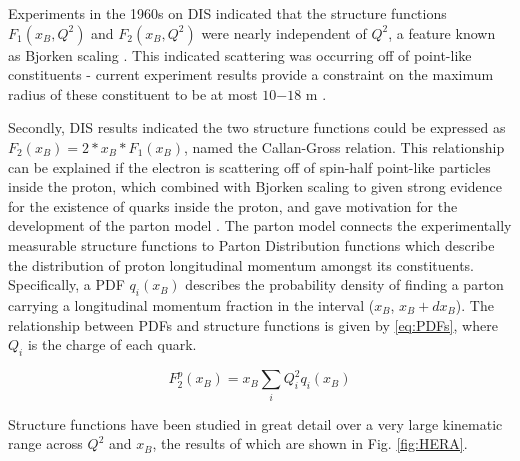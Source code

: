         Experiments in the 1960s on DIS indicated that the structure functions $F_1(x_B,Q^2)$ and $F_2(x_B,Q^2)$ were nearly independent of $Q^2$, a feature known as Bjorken scaling \parencite{Bjorken1969InelasticNucleon}. This indicated scattering was occurring off of point-like constituents - current experiment results provide a constraint on the maximum radius of these constituent to be at most $10{-18}$ m \parencite{Thomson2013ModernPhysics}. 


        Secondly, DIS results indicated the two structure functions could be expressed as $F_2(x_B) = 2*x_B*F_1(x_B)$, named the Callan-Gross relation. This relationship can be explained if the electron is scattering off of spin-half point-like particles inside the proton, which combined with Bjorken scaling to given strong evidence for the existence of quarks inside the proton, and gave motivation for the development of the parton model \parencite{Feynman1969VeryHadrons}.
        The parton model connects the experimentally measurable structure functions to Parton Distribution functions which describe the distribution of proton longitudinal momentum amongst its constituents. Specifically, a PDF $q_i(x_B)$ describes the probability density of finding a parton carrying a longitudinal momentum fraction in the interval ($x_B$, $x_B + dx_B$). The relationship between PDFs and structure functions is given by \eqref{eq:PDFs}, where $Q_i$ is the charge of each quark.

        \begin{equation}\label{eq:PDFs}
            F_2^p(x_B) = x_B \sum_i Q^2_i q_i(x_B)
        \end{equation}
        
        Structure functions have been studied in great detail over a very large kinematic range across $Q^2$ and $x_B$, the results of which are shown in Fig. \ref{fig:HERA}.
    
